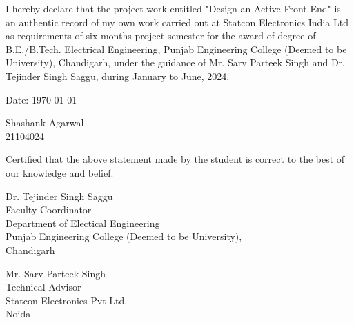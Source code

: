I hereby declare that the project work entitled "Design an Active Front End" is
an authentic record of my own work carried out at Statcon Electronics India Ltd
as requirements of six months project semester for the award of degree of
B.E./B.Tech. Electrical Engineering, Punjab Engineering College (Deemed to be
University), Chandigarh, under the guidance of Mr. Sarv Parteek Singh and Dr.
Tejinder Singh Saggu, during January to June, 2024.

\vspace*{2.5cm}
\noindent
\begin{minipage}[t]{0.5\textwidth}
    \raggedright
    Date: {\today}
\end{minipage}
\hfill
\begin{minipage}[t]{0.5\textwidth}
    \raggedleft
    Shashank Agarwal\\
    21104024

\end{minipage}
\vfill

\noindent
Certified that the above statement made by the student is correct to the best of our knowledge and belief.

\vspace*{2cm}

\noindent
\begin{minipage}[t]{0.5\textwidth}
    \raggedright
    Dr. Tejinder Singh Saggu\\
    Faculty Coordinator\\
    Department of Electical Engineering\\
    Punjab Engineering College (Deemed to be University),\\
    Chandigarh
\end{minipage}
\hfill
\begin{minipage}[t]{0.5\textwidth}
    \raggedleft
    Mr. Sarv Parteek Singh\\
    Technical Advisor\\
    Statcon Electronics Pvt Ltd,\\
    Noida

\end{minipage}